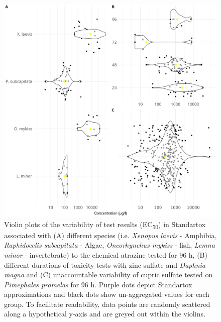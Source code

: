 \begin{figure}[h!]
    \includegraphics[width=1.0\textwidth]{article/figures/results_variability.png}
    \caption{Violin plots of the variability of test results (EC\textsubscript{50}) in Standartox associated with (A) different species (i.e. \textit{Xenopus laevis} - Amphibia, \textit{Raphidocelis subcapitata} - Algae, \textit{Oncorhynchus mykiss} - fish, \textit{Lemna minor} - invertebrate) to the chemical atrazine tested for 96 h, (B) diﬀerent durations of toxicity tests with zinc sulfate and \textit{Daphnia magna} and (C) unaccountable variability of cupric sulfate tested on \textit{Pimephales promelas} for 96 h. Purple dots depict Standartox approximations and black dots show un-aggregated values for each group. To facilitate readability, data points are randomly scattered along a hypothetical y-axis and are greyed out within the violins.}
    \label{fig:stx-variability}
\end{figure}

